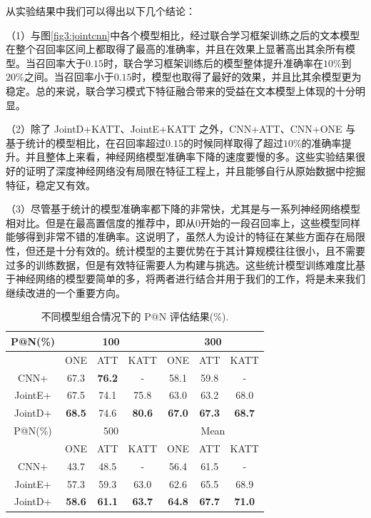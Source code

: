 从实验结果中我们可以得出以下几个结论：

（1）与图\ref{fig3:jointcnn}中各个模型相比，经过联合学习框架训练之后的文本模型在整个召回率区间上都取得了最高的准确率，并且在效果上显著高出其余所有模型。当召回率大于$0.15$时，联合学习框架训练后的模型整体提升准确率在$10\%$到$20\%$之间。当召回率小于$0.15$时，模型也取得了最好的效果，并且比其余模型更为稳定。总的来说，联合学习模式下特征融合带来的受益在文本模型上体现的十分明显。

（2）除了 JointD+KATT、JointE+KATT 之外，CNN+ATT、CNN+ONE 与基于统计的模型相比，在召回率超过$0.15$的时候同样取得了超过$10\%$的准确率提升。并且整体上来看，神经网络模型准确率下降的速度要慢的多。这些实验结果很好的证明了深度神经网络没有局限在特征工程上，并且能够自行从原始数据中挖掘特征，稳定又有效。

（3）尽管基于统计的模型准确率都下降的非常快，尤其是与一系列神经网络模型相对比。但是在最高置信度的推荐中，即从$0$开始的一段召回率上，这些模型同样能够得到非常不错的准确率。这说明了，虽然人为设计的特征在某些方面存在局限性，但还是十分有效的。统计模型的主要优势在于其计算规模往往很小，且不需要过多的训练数据，但是有效特征需要人为构建与挑选。这些统计模型训练难度比基于神经网络的模型要简单的多，将两者进行结合并用于我们的工作，将是未来我们继续改进的一个重要方向。

\begin{table}[h]
\centering
\caption{不同模型组合情况下的 P@N 评估结果(\%).}
\begin{tabular}{|c|ccc|ccc|} 
\hline
P@N(\%) & \multicolumn{3}{c|}{100}                                      & \multicolumn{3}{c|}{300} \\ \hline
& \multicolumn{1}{c|}{ONE} & \multicolumn{1}{c|}{ATT} & KATT & \multicolumn{1}{c|}{ONE} & \multicolumn{1}{c|}{ATT} & KATT \\ \hline
CNN+	& 67.3	& \textbf{76.2}	& -     & 58.1	& 59.8 	& -    \\ \cline{1-1}
JointE+  & 67.5 	& 74.1	& 75.8  & 63.0 	& 63.2 	& 68.0  \\ \cline{1-1}  
JointD+  & \textbf{68.5}    & 74.6  & \textbf{80.6}  & \textbf{67.0} & \textbf{67.3} & \textbf{68.7}  \\ \hline
P@N(\%) & \multicolumn{3}{c|}{500}                                      & \multicolumn{3}{c|}{Mean} \\ \hline 
& \multicolumn{1}{c|}{ONE} & \multicolumn{1}{c|}{ATT} & KATT & \multicolumn{1}{c|}{ONE} & \multicolumn{1}{c|}{ATT} & KATT \\ \hline
CNN+	& 43.7	& 48.5			& -     & 56.4 	& 61.5 	& -     \\ \cline{1-1}
JointE+  & 57.3 	& 59.3 	& 63.0  & 62.6 	& 65.5  & 68.9  \\ \cline{1-1}
JointD+  & \textbf{58.6}    & \textbf{61.1}  & \textbf{63.7}  & \textbf{64.8}   & \textbf{67.7}    & \textbf{71.0}  \\ \hline
\end{tabular}
\label{tab3:relationExt}
\end{table}


